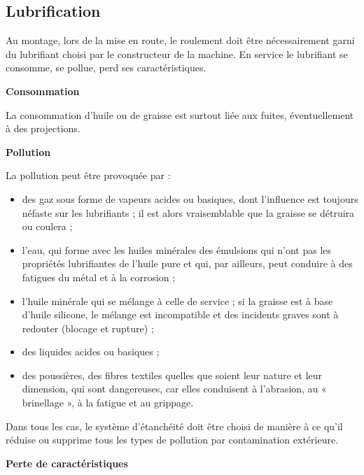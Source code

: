 \subsection{	Lubrification }

Au montage, lors de la mise en route, le roulement doit être nécessairement garni du lubrifiant choisi par le constructeur de la machine.
En service le lubrifiant se consomme, se pollue, perd ses caractéristiques.



\vspace{0.3cm}
\textbf{Consommation}
\vspace{0.3cm}

La consommation d’huile ou de graisse est surtout liée aux fuites, éventuellement à des projections.


\vspace{0.3cm}
\textbf{Pollution}
\vspace{0.3cm} 

La pollution peut être provoquée par :

\begin{itemize}
\item  des gaz sous forme de vapeurs acides ou basiques, dont l’influence est toujours néfaste sur les lubrifiants ; il est alors vraisemblable que la graisse se détruira ou coulera ;
\item  l’eau, qui forme avec les huiles minérales des émulsions qui n’ont pas les propriétés lubrifiantes de l’huile pure et qui, par ailleurs, peut conduire à des fatigues du métal et à la corrosion ;
\item  l’huile minérale qui se mélange à celle de service ; si la graisse est à base d’huile silicone, le mélange est incompatible et des incidents graves sont à redouter (blocage et rupture) ;
\item  des liquides acides ou basiques ;
\item  des poussières, des fibres textiles quelles que soient leur nature et leur dimension, qui sont dangereuses, car elles conduisent à l’abrasion, au « brinellage », à la fatigue et au grippage.
\end{itemize}

Dans tous les cas, le système d’étanchéité doit être choisi de manière à ce qu’il réduise ou supprime tous les types de pollution par contamination extérieure.

\vspace{0.3cm}
\textbf{Perte de caractéristiques}
\vspace{0.3cm}

